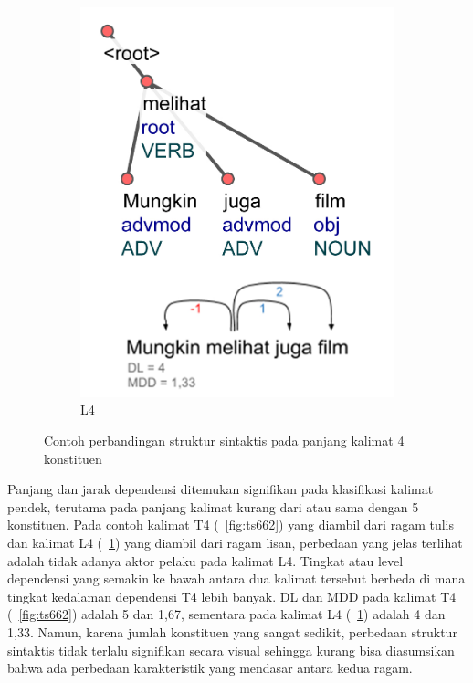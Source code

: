 \begin{figure}
\begin{subfigure}{.3\linewidth}
  \includegraphics[width=1\linewidth]{pics/ls1102.jpg} 
	\caption{L4}
	\label{fig:ls1102} 
\end{subfigure}

\caption{Contoh perbandingan struktur sintaktis pada panjang kalimat 4 konstituen}
\label{fig:struktur4}
\end{figure}

Panjang dan jarak dependensi ditemukan signifikan pada klasifikasi kalimat pendek, terutama pada panjang kalimat kurang dari atau sama dengan 5 konstituen. Pada contoh kalimat T4 (\pic~\ref{fig:ts662}) yang diambil dari ragam tulis dan kalimat L4 (\pic~\ref{fig:ls1102}) yang diambil dari ragam lisan, perbedaan yang jelas terlihat adalah tidak adanya aktor pelaku pada kalimat L4. Tingkat atau level dependensi yang semakin ke bawah antara dua kalimat tersebut berbeda di mana tingkat kedalaman dependensi T4 lebih banyak. DL dan MDD pada kalimat T4 (\pic~\ref{fig:ts662}) adalah 5 dan 1,67, sementara pada kalimat L4 (\pic~\ref{fig:ls1102}) adalah 4 dan 1,33. Namun, karena jumlah konstituen yang sangat sedikit, perbedaan struktur sintaktis tidak terlalu signifikan secara visual sehingga kurang bisa diasumsikan bahwa ada perbedaan karakteristik yang mendasar antara kedua ragam. 

